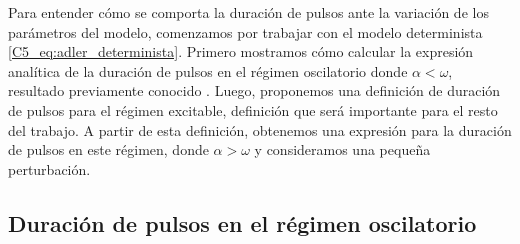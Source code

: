 \documentclass[./main.tex]{subfiles}
\begin{document}
Para entender cómo se comporta la duración de pulsos ante la variación de los parámetros del modelo, comenzamos por trabajar con el modelo determinista \ref{C5_eq:adler_determinista}. Primero mostramos cómo calcular la expresión analítica de la duración de pulsos en el régimen oscilatorio donde $\alpha < \omega$, resultado previamente conocido \cite{Strogatz1994}. Luego, proponemos una definición de duración de pulsos para el régimen excitable, definición que será importante para el resto del trabajo. A partir de esta definición, obtenemos una expresión para la duración de pulsos en este régimen, donde $\alpha > \omega$ y consideramos una pequeña perturbación.


\subsection{Duración de pulsos en el régimen oscilatorio }
\label{C5_sec:T_osc}
\end{document}
